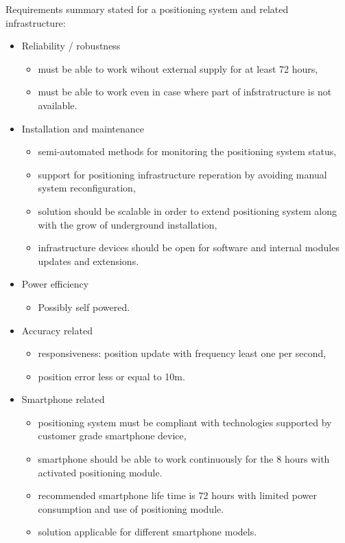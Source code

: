 \documentclass[../main.tex]{subfiles}
\begin{document}
Requirements summary stated for a positioning system and related infrastructure:
\begin{itemize}
	\item Reliability / robustness
	\begin{itemize}
		\item must be able to work wihout external supply for at least 72 hours,
		\item must be able to work even in case where part of infstratructure is not available.
	\end{itemize}
	\item Installation and maintenance
	\begin{itemize}
		\item semi-automated methods for monitoring the positioning system status,
		\item support for positioning infrastructure reperation by avoiding manual system reconfiguration,
		\item solution should be scalable in order to extend positioning system along with the grow of underground installation,
		\item infrastructure devices should be open for software and internal modules updates and extensions.
	\end{itemize}
	\item Power efficiency
	\begin{itemize}
		\item Possibly self powered.
	\end{itemize}
	\item Accuracy related
	\begin{itemize}
		\item responsiveness: position update with frequency least one per second,
		\item position error less or equal to 10m.
	\end{itemize}
	\item Smartphone related
	\begin{itemize}
		\item positioning system must be compliant with technologies supported by customer grade smartphone device,
		\item smartphone should be able to work continuously for the 8 hours with activated positioning module.
		\item recommended smartphone life time is 72 hours with limited power consumption and use of positioning module.
		\item solution applicable for different smartphone models.

\end{itemize}
\end{itemize}
\end{document}
